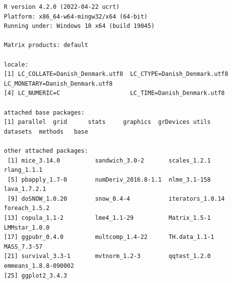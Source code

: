 \documentclass[12pt]{article}
\begin{document}
\begin{verbatim}
R version 4.2.0 (2022-04-22 ucrt)
Platform: x86_64-w64-mingw32/x64 (64-bit)
Running under: Windows 10 x64 (build 19045)

Matrix products: default

locale:
[1] LC_COLLATE=Danish_Denmark.utf8  LC_CTYPE=Danish_Denmark.utf8    LC_MONETARY=Danish_Denmark.utf8
[4] LC_NUMERIC=C                    LC_TIME=Danish_Denmark.utf8    

attached base packages:
[1] parallel  grid      stats     graphics  grDevices utils     datasets  methods   base     

other attached packages:
 [1] mice_3.14.0          sandwich_3.0-2       scales_1.2.1         rlang_1.1.1         
 [5] pbapply_1.7-0        numDeriv_2016.8-1.1  nlme_3.1-158         lava_1.7.2.1        
 [9] doSNOW_1.0.20        snow_0.4-4           iterators_1.0.14     foreach_1.5.2       
[13] copula_1.1-2         lme4_1.1-29          Matrix_1.5-1         LMMstar_1.0.0       
[17] ggpubr_0.4.0         multcomp_1.4-22      TH.data_1.1-1        MASS_7.3-57         
[21] survival_3.3-1       mvtnorm_1.2-3        qqtest_1.2.0         emmeans_1.8.8-090002
[25] ggplot2_3.4.3       


\end{verbatim}
\end{document}
